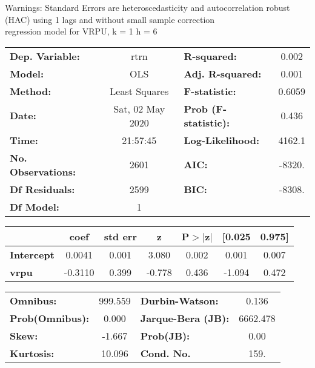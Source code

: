 Warnings: \newline
 [1] Standard Errors are heteroscedasticity and autocorrelation robust (HAC) using 1 lags and without small sample correction\\ 

regression model for VRPU, k = 1 h = 6\begin{center}
\begin{tabular}{lclc}
\toprule
\textbf{Dep. Variable:}    &       rtrn       & \textbf{  R-squared:         } &     0.002   \\
\textbf{Model:}            &       OLS        & \textbf{  Adj. R-squared:    } &     0.001   \\
\textbf{Method:}           &  Least Squares   & \textbf{  F-statistic:       } &    0.6059   \\
\textbf{Date:}             & Sat, 02 May 2020 & \textbf{  Prob (F-statistic):} &    0.436    \\
\textbf{Time:}             &     21:57:45     & \textbf{  Log-Likelihood:    } &    4162.1   \\
\textbf{No. Observations:} &        2601      & \textbf{  AIC:               } &    -8320.   \\
\textbf{Df Residuals:}     &        2599      & \textbf{  BIC:               } &    -8308.   \\
\textbf{Df Model:}         &           1      & \textbf{                     } &             \\
\bottomrule
\end{tabular}
\begin{tabular}{lcccccc}
                   & \textbf{coef} & \textbf{std err} & \textbf{z} & \textbf{P$> |$z$|$} & \textbf{[0.025} & \textbf{0.975]}  \\
\midrule
\textbf{Intercept} &       0.0041  &        0.001     &     3.080  &         0.002        &        0.001    &        0.007     \\
\textbf{vrpu}      &      -0.3110  &        0.399     &    -0.778  &         0.436        &       -1.094    &        0.472     \\
\bottomrule
\end{tabular}
\begin{tabular}{lclc}
\textbf{Omnibus:}       & 999.559 & \textbf{  Durbin-Watson:     } &    0.136  \\
\textbf{Prob(Omnibus):} &   0.000 & \textbf{  Jarque-Bera (JB):  } & 6662.478  \\
\textbf{Skew:}          &  -1.667 & \textbf{  Prob(JB):          } &     0.00  \\
\textbf{Kurtosis:}      &  10.096 & \textbf{  Cond. No.          } &     159.  \\
\bottomrule
\end{tabular}
\end{center}

